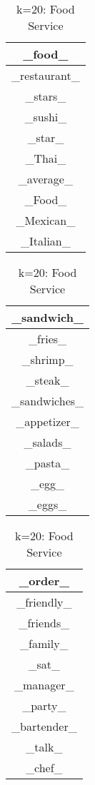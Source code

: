 \documentclass{article}
\begin{document}
\begin{table}[ht]
    \parbox{.25\linewidth}{
    \centering
    \begin{tabular}{|c|}
    \hline
    \_food\_\\
    \hline
    \_restaurant\_\\
    \hline
    \_stars\_\\
    \hline
    \_sushi\_\\
    \hline
    \_star\_\\
    \hline
    \_Thai\_\\
    \hline
    \_average\_\\
    \hline
    \_Food\_\\
    \hline
    \_Mexican\_\\
    \hline
    \_Italian\_\\
    \hline
    \end{tabular}
    \caption{k=20: Food Types}
    }
    \hfill
    \parbox{.25\linewidth}{
    \centering
    \begin{tabular}{|c|}
    \hline
    \_sandwich\_\\
    \hline
    \_fries\_\\
    \hline
    \_shrimp\_\\
    \hline
    \_steak\_\\
    \hline
    \_sandwiches\_\\
    \hline
    \_appetizer\_\\
    \hline
    \_salads\_\\
    \hline
    \_pasta\_\\
    \hline
    \_egg\_\\
    \hline
    \_eggs\_\\
    \hline
    \end{tabular}
    \caption{k=20: Food Items}
    }
    \hfill
    \parbox{.25\linewidth}{
    \centering
    \begin{tabular}{|c|}
    \hline
    \_order\_\\
    \hline
    \_friendly\_\\
    \hline
    \_friends\_\\
    \hline
    \_family\_\\
    \hline
    \_sat\_\\
    \hline
    \_manager\_\\
    \hline
    \_party\_\\
    \hline
    \_bartender\_\\
    \hline
    \_talk\_\\
    \hline
    \_chef\_\\
    \hline
    \end{tabular}
    \caption{k=20: Food Service}
    }
\end{table}\\
\end{document}
